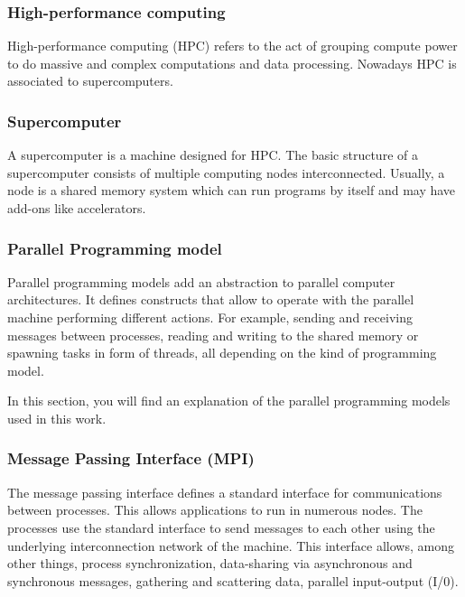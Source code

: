 \subsubsection{High-performance computing}

\justify
High-performance computing (HPC) refers to the act of grouping compute power to do massive and complex computations and data processing. Nowadays HPC is associated to supercomputers.

\subsubsection{Supercomputer}

\justify
A supercomputer is a machine designed for HPC. The basic structure of a supercomputer consists of multiple computing nodes interconnected. Usually, a node is a shared memory system which can run programs by itself and may have add-ons like accelerators.

\subsubsection{Parallel Programming model}

\justify
Parallel programming models\cite{programminModels} add an abstraction to parallel computer architectures.  It defines constructs that allow to operate with the parallel machine performing different actions. For example, sending and receiving messages between processes, reading and writing to the shared memory or spawning tasks in form of threads, all depending on the kind of programming model.

\justify
In this section, you will find an explanation of the parallel programming models used in this work.

\subsubsection{Message Passing Interface (MPI)}

\justify
The message passing interface\cite{mpi} defines a standard  interface for communications between processes. This allows applications to run in numerous nodes. The processes use the standard interface to send messages to each other using the underlying interconnection network of the machine.  This interface allows, among other things, process synchronization, data-sharing via asynchronous and synchronous messages, gathering and scattering data, parallel input-output (I/0).


